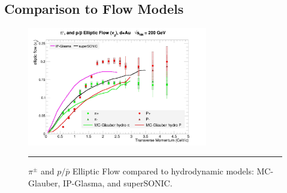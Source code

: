 \subsection{Comparison to Flow Models}
\begin{figure}[hbtp]
\centering    
    \includegraphics[width=0.7\textwidth]{results/v2allpipmodels.jpg}
    \rule{35em}{0.5pt}
    \caption[$\pi^{\pm}$ and $p/\bar{p}$ Elliptic Flow compared to hydrodynamic models.]{$\pi^{\pm}$ and $p/\bar{p}$ Elliptic Flow compared to hydrodynamic models: MC-Glauber\citep{Nagle:2013lja}, IP-Glasma\citep{Schenke:2014gaa}, and superSONIC\citep{Romatschke2015}.}\label{fig:hydrov2}
\end{figure}

